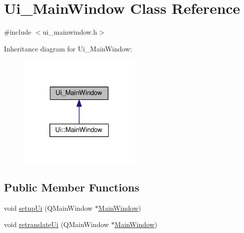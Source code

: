\hypertarget{class_ui___main_window}{}\section{Ui\+\_\+\+Main\+Window Class Reference}
\label{class_ui___main_window}


{\ttfamily \#include $<$ui\+\_\+mainwindow.\+h$>$}



Inheritance diagram for Ui\+\_\+\+Main\+Window\+:\nopagebreak
\begin{figure}[H]
\begin{center}
\leavevmode
\includegraphics[width=169pt]{class_ui___main_window__inherit__graph}
\end{center}
\end{figure}
\subsection*{Public Member Functions}
\begin{DoxyCompactItemize}
\item 
void \hyperlink{class_ui___main_window_acf4a0872c4c77d8f43a2ec66ed849b58}{setup\+Ui} (Q\+Main\+Window $\ast$\hyperlink{class_main_window}{Main\+Window})
\item 
void \hyperlink{class_ui___main_window_a097dd160c3534a204904cb374412c618}{retranslate\+Ui} (Q\+Main\+Window $\ast$\hyperlink{class_main_window}{Main\+Window})
\end{DoxyCompactItemize}
